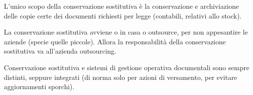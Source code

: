 L'unico scopo della conservazione sostitutiva \`e la conservazione e
archiviazione delle copie certe dei documenti richiesti per legge
(contabili, relativi allo stock).

La conservazione sostitutiva avviene o in casa o outsource, per non
appesantire le aziende (specie quelle piccole). Allora la responsabilit\`a
della conservazione sostitutiva va all'azienda outsourcing.

Conservazione sostitutiva e sistemi di gestione operativa documentali
sono sempre distinti, seppure integrati (di norma solo per azioni di
versamento, per evitare aggiornamenti sporchi).




